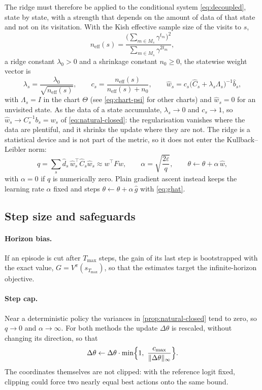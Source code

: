 \documentclass[11pt,a4paper]{article}
\numberwithin{equation}{section}
\theoremstyle{plain}
\theoremstyle{definition}
\theoremstyle{remark}
\newcommand{\T}{^{\top}}
\begin{document}
The ridge must therefore be applied to the conditional system \eqref{eq:decoupled}, state by state, with a strength that depends on the amount of data of that state and not on its visitation.
With the Kish effective sample size of the visits to $s$,
\begin{equation}\label{eq:neff}
  n_{\mathrm{eff}}(s)=\frac{\bigl(\sum_{m\in M_s}\gamma^{t_m}\bigr)^2}{\sum_{m\in M_s}\gamma^{2t_m}},
\end{equation}
a ridge constant $\lambda_0>0$ and a shrinkage constant $n_0\ge0$, the statewise weight vector is
\begin{equation}\label{eq:statewise}
  \lambda_s=\frac{\lambda_0}{\sqrt{n_{\mathrm{eff}}(s)}},\qquad
  c_s=\frac{n_{\mathrm{eff}}(s)}{n_{\mathrm{eff}}(s)+n_0},\qquad
  \hat w_s=c_s\bigl(\hat C_s+\lambda_s\Lambda_s\bigr)^{-1}\hat b_s,
\end{equation}
with $\Lambda_s=I$ in the chart $\Theta$ (see \eqref{eq:chart-psi} for other charts) and $\hat w_s=0$ for an unvisited state. As the data of a state accumulate, $\lambda_s\to0$ and $c_s\to1$, so
$\hat w_s\to C_s^{-1}b_s=w_s$ of \eqref{eq:natural-closed}: the regularisation vanishes where the data are plentiful, and it shrinks the update where they are not. The ridge is a statistical device and is
not part of the metric, so it does not enter the Kullback--Leibler norm:
\begin{equation}\label{eq:q-alpha}
  q=\sum_s\hat d_s\,\hat w_s\T\hat C_s\hat w_s\approx w\T Fw,\qquad
  \alpha=\sqrt{\frac{2\varepsilon}{q}},\qquad
  \theta\leftarrow\theta+\alpha\,\hat w,
\end{equation}
with $\alpha=0$ if $q$ is numerically zero. Plain gradient ascent instead keeps the learning rate $\alpha$ fixed and steps $\theta\leftarrow\theta+\alpha\,\hat g$ with \eqref{eq:ghat}.

\subsection{Step size and safeguards}

\paragraph{Horizon bias.}
If an episode is cut after $T_{\max}$ steps, the gain of its last step is bootstrapped with the exact value, $G=V^\pi(s_{T_{\max}})$, so that the estimates target the infinite-horizon objective.

\paragraph{Step cap.}
Near a deterministic policy the variances in \cref{prop:natural-closed} tend to zero, so $q\to0$ and $\alpha\to\infty$. For both methods the update $\Delta\theta$ is rescaled, without changing its direction, so that
\begin{equation}\label{eq:cap}
  \Delta\theta\leftarrow\Delta\theta\cdot\min\Bigl\{1,\ \frac{c_{\max}}{\|\Delta\theta\|_\infty}\Bigr\}.
\end{equation}
The coordinates themselves are not clipped: with the reference logit fixed, clipping could force two nearly equal best actions onto the same bound.
\end{document}
